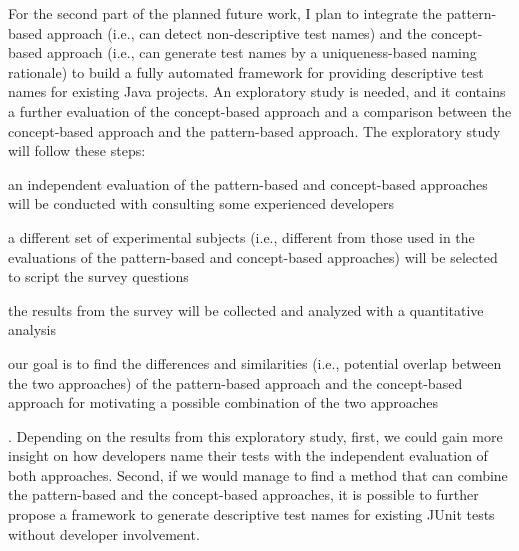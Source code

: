 For the second part of the planned future work, I plan to integrate the pattern-based approach (i.e., can detect non-descriptive test names) and the concept-based approach (i.e., can generate test names by a uniqueness-based naming rationale) to build a fully automated framework for providing descriptive test names for existing Java projects.
%
An exploratory study is needed, and it contains a further evaluation of the concept-based approach and a comparison between the concept-based approach and the pattern-based approach.
%
The exploratory study will follow these steps:
\begin{enumerate*}
\item an independent evaluation of the pattern-based and concept-based approaches will be conducted with consulting some experienced developers
\item a different set of experimental subjects (i.e., different from those used in the evaluations of the pattern-based and concept-based approaches) will be selected to script the survey questions
\item the results from the survey will be collected and analyzed with a quantitative analysis
\item our goal is to find the differences and similarities (i.e., potential overlap between the two approaches) of the pattern-based approach and the concept-based approach for motivating a possible combination of the two approaches
\end{enumerate*}.
%
Depending on the results from this exploratory study, first, we could gain more insight on how developers name their tests with the independent evaluation of both approaches.
%
Second, if we would manage to find a method that can combine the pattern-based and the concept-based approaches, it is possible to further propose a framework to generate descriptive test names for existing JUnit tests without developer involvement.
